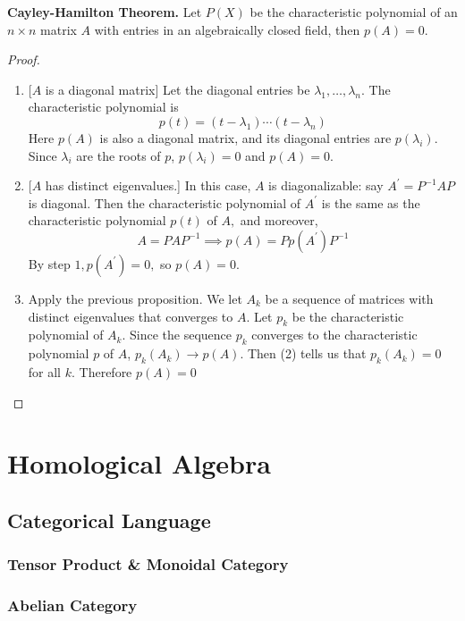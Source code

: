 \documentclass[10pt]{report}
\theoremstyle{definition}
\begin{document}
\textbf{Cayley-Hamilton Theorem.} Let $P(X)$ be the characteristic polynomial of an $n\times n$ matrix $A$ with entries in an algebraically closed field, then $p(A)=0$.
\begin{proof}{}\leavevmode{}
\begin{enumerate}
\item {} [$A$ is a diagonal matrix]
Let the diagonal entries be $\lambda_{1}, \ldots, \lambda_{n} .$ The characteristic polynomial is
\[
p(t)=\left(t-\lambda_{1}\right) \cdots\left(t-\lambda_{n}\right)
\]
Here $p(A)$ is also a diagonal matrix, and its diagonal entries are $p\left(\lambda_{i}\right)$. Since $\lambda_{i}$ are the roots of $p$, $p\left(\lambda_{i}\right)=0$ and $p(A)=0$.
\item {} [$A$ has distinct eigenvalues.]
In this case, $A$ is diagonalizable: say $A^{\prime}=P^{-1} A P$ is diagonal. Then the characteristic polynomial of $A^{\prime}$ is the same as the characteristic polynomial $p(t)$ of $A,$ and moreover,
\[
A=PAP^{-1}\implies p(A)=P p\left(A^{\prime}\right) P^{-1}
\]
By step $1, p\left(A^{\prime}\right)=0,$ so $p(A)=0$.
\item
Apply the previous proposition.
We let $A_{k}$ be a sequence of matrices with distinct eigenvalues that converges to $A$.
Let $p_{k}$ be the characteristic polynomial of $A_{k}$.
Since the sequence $p_{k}$ converges to the characteristic polynomial $p$ of $A$, $p_{k}\left(A_{k}\right) \rightarrow p(A)$. Then (2) tells us that $p_{k}\left(A_{k}\right)=0$ for all $k$. Therefore $p(A)=0$
\end{enumerate}
\end{proof}


\chapter{Homological Algebra}

\section{Categorical Language}

\subsection{Tensor Product \& Monoidal Category}

\subsection{Abelian Category}
\end{document}
